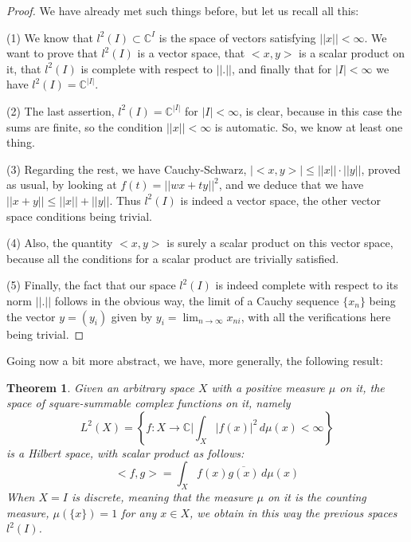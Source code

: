 \documentclass[12pt]{amsbook}
\newtheorem{theorem}{Theorem}[chapter]
\begin{document}
\begin{proof}
We have already met such things before, but let us recall all this:

\medskip

(1) We know that $l^2(I)\subset\mathbb C^I$ is the space of vectors satisfying $||x||<\infty$. We want to prove that $l^2(I)$ is a vector space, that $<x,y>$ is a scalar product on it, that $l^2(I)$ is complete with respect to $||.||$, and finally that for $|I|<\infty$ we have $l^2(I)=\mathbb C^{|I|}$.

\medskip

(2) The last assertion, $l^2(I)=\mathbb C^{|I|}$ for $|I|<\infty$, is clear, because in this case the sums are finite, so the condition $||x||<\infty$ is automatic. So, we know at least one thing.

\medskip

(3) Regarding the rest, we have Cauchy-Schwarz, $|<x,y>|\leq||x||\cdot||y||$, proved as usual, by looking at $f(t)=||wx+ty||^2$, and we deduce that we have $||x+y||\leq||x||+||y||$. Thus $l^2(I)$ is indeed a vector space, the other vector space conditions being trivial.

\medskip

(4) Also, the quantity $<x,y>$ is surely a scalar product on this vector space, because all the conditions for a scalar product are trivially satisfied.

\medskip

(5) Finally, the fact that our space $l^2(I)$ is indeed complete with respect to its norm $||.||$ follows in the obvious way, the limit of a Cauchy sequence $\{x_n\}$ being the vector $y=(y_i)$ given by $y_i=\lim_{n\to\infty}x_{ni}$, with all the verifications here being trivial.
\end{proof}

Going now a bit more abstract, we have, more generally, the following result:


\begin{theorem}
Given an arbitrary space $X$ with a positive measure $\mu$ on it, the space of square-summable complex functions on it, namely
$$L^2(X)=\left\{f:X\to\mathbb C\Big|\int_X|f(x)|^2\,d\mu(x)<\infty\right\}$$
is a Hilbert space, with scalar product as follows:
$$<f,g>=\int_Xf(x)\overline{g(x)}\,d\mu(x)$$
When $X=I$ is discrete, meaning that the measure $\mu$ on it is the counting measure, $\mu(\{x\})=1$ for any $x\in X$, we obtain in this way the previous spaces $l^2(I)$.
\end{theorem}
\end{document}
